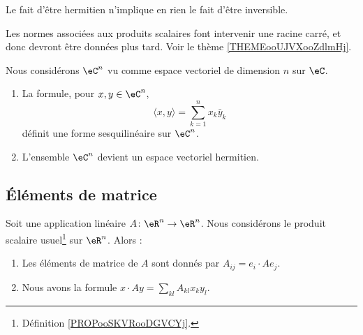\begin{remark}
	Le fait d'être hermitien n'implique en rien le fait d'être inversible.
\end{remark}

\begin{normaltext}
	Les normes associées aux produits scalaires font intervenir une racine carré, et donc devront être données plus tard. Voir le thème \ref{THEMEooUJVXooZdlmHj}.
\end{normaltext}

\begin{proposition}      \label{PROPooMWUCooMbJuaJ}
	Nous considérons \(\eC^n\) vu comme espace vectoriel de dimension \( n\) sur \( \eC\).
	\begin{enumerate}
		\item
		      La formule, pour \( x,y\in \eC^n\),
		      \begin{equation}    \label{EqFormSesqQrjyPH}
			      \langle x, y\rangle =\sum_{k=1}^nx_k\bar y_k
		      \end{equation}
		      définit une forme sesquilinéaire sur \( \eC^n\).
		\item
		      L'ensemble \( \eC^n\) devient un espace vectoriel hermitien.
	\end{enumerate}
\end{proposition}

\subsection{Éléments de matrice}

\begin{proposition}     \label{PROPooZKWXooWmEzoA}
	Soit une application linéaire \( A\colon \eR^n\to \eR^n\). Nous considérons le produit scalaire usuel\footnote{Définition \ref{PROPooSKVRooDGVCYj}.} sur \( \eR^n\). Alors :
	\begin{enumerate}
		\item
		      Les éléments de matrice de \( A\) sont donnés par \( A_{ij}=e_i\cdot Ae_j\).
		\item
		      Nous avons la formule \( x\cdot Ay=\sum_{kl}A_{kl}x_ky_l \).
	\end{enumerate}
\end{proposition}

